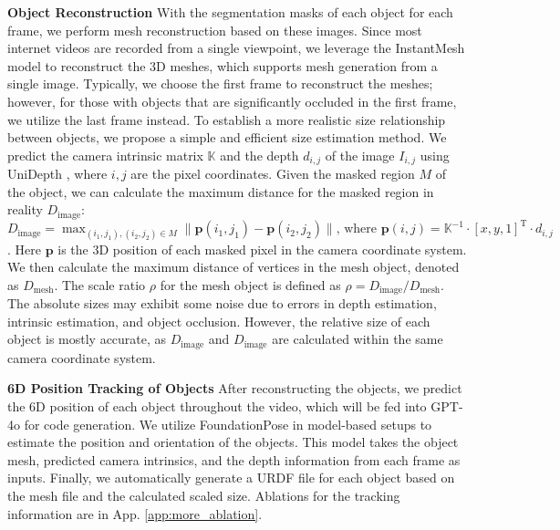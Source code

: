 \textbf{Object Reconstruction} With the segmentation masks of each object for each frame, we perform mesh reconstruction based on these images. Since most internet videos are recorded from a single viewpoint, we leverage the InstantMesh model \citep{xu2024instantmesh} to reconstruct the 3D meshes, which supports mesh generation from a single image. Typically, we choose the first frame to reconstruct the meshes; however, for those with objects that are significantly occluded in the first frame, we utilize the last frame instead.
To establish a more realistic size relationship between objects, we propose a simple and efficient size estimation method. We predict the camera intrinsic matrix $\mathbb{K}$ and the depth $d_{i,j}$ of the image $I_{i,j}$ using UniDepth \citep{piccinelli2024unidepth}, where $i,j$ are the pixel coordinates. Given the masked region $M$ of the object, we can calculate the maximum distance for the masked region in reality $D_{\text{image}}$:
$
    D_{\text{image}} = \max_{(i_1,j_1), (i_2, j_2) \in M} \|\mathbf{p}(i_1, j_1) - \mathbf{p}(i_2, j_2)\| \text{, where } \mathbf{p}(i, j) = \mathbb{K}^{-1} \cdot [x, y, 1]^\text{T}
    \cdot d_{i,j}
$.
Here $\mathbf{p}$ is the 3D position of each masked pixel in the camera coordinate system. We then calculate the maximum distance of vertices in the mesh object, denoted as $D_{\text{mesh}}$. The scale ratio $\rho$ for the mesh object is defined as $\rho = D_{\text{image}} / D_{\text{mesh}}$. 
The absolute sizes may exhibit some noise due to errors in depth estimation, intrinsic estimation, and object occlusion. However, the relative size of each object is mostly accurate, as $D_{\text{image}}$ and $D_{\text{image}}$ are calculated within the same camera coordinate system. 

\textbf{6D Position Tracking of Objects} After reconstructing the objects, we predict the 6D position of each object throughout the video, which will be fed into GPT-4o for code generation. We utilize FoundationPose \citep{wen2024foundationpose} in model-based setups to estimate the position and orientation of the objects. This model takes the object mesh, predicted camera intrinsics, and the depth information from each frame as inputs. Finally, we automatically generate a URDF file for each object based on the mesh file and the calculated scaled size.
Ablations for the tracking information are in App. \ref{app:more_ablation}.

